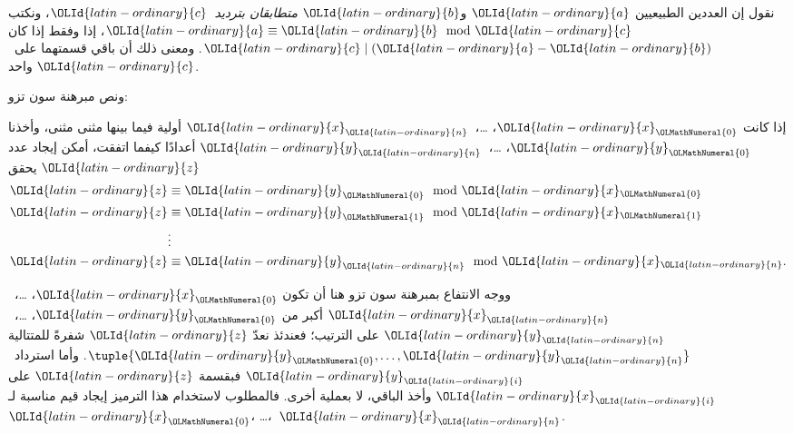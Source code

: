 \documentclass[../../../include/open-logic-section]{subfiles}
\begin{document}
\begin{defn}
نقول إن العددين الطبيعيين $\OLId{latin-ordinary}{a}$ و$\OLId{latin-ordinary}{b}$ \emph{متطابقان بترديد~$\OLId{latin-ordinary}{c}$}، ونكتب
$\OLId{latin-ordinary}{a}\equiv \OLId{latin-ordinary}{b}\mod \OLId{latin-ordinary}{c}$، إذا وفقط إذا كان $\OLId{latin-ordinary}{c}\mid(\OLId{latin-ordinary}{a}-\OLId{latin-ordinary}{b})$.
ومعنى ذلك أن باقي قسمتهما على~$\OLId{latin-ordinary}{c}$ واحد.
\end{defn}

ونص مبرهنة سون تزو:
\begin{thm}
إذا كانت $\OLId{latin-ordinary}{x}_\OLMathNumeral{0}$، \dots،~$\OLId{latin-ordinary}{x}_\OLId{latin-ordinary}{n}$ أولية فيما بينها مثنى مثنى، وأخذنا
$\OLId{latin-ordinary}{y}_\OLMathNumeral{0}$، \dots،~$\OLId{latin-ordinary}{y}_\OLId{latin-ordinary}{n}$ أعدادًا كيفما اتفقت، أمكن إيجاد عدد $\OLId{latin-ordinary}{z}$ يحقق
\begin{align*}
\OLId{latin-ordinary}{z} & \equiv \OLId{latin-ordinary}{y}_\OLMathNumeral{0} \mod \OLId{latin-ordinary}{x}_\OLMathNumeral{0} \\
\OLId{latin-ordinary}{z} & \equiv \OLId{latin-ordinary}{y}_\OLMathNumeral{1} \mod \OLId{latin-ordinary}{x}_\OLMathNumeral{1} \\
& \vdots  \\
\OLId{latin-ordinary}{z} & \equiv \OLId{latin-ordinary}{y}_\OLId{latin-ordinary}{n} \mod \OLId{latin-ordinary}{x}_\OLId{latin-ordinary}{n}.
\end{align*}
\end{thm}

ووجه الانتفاع بمبرهنة سون تزو هنا أن تكون $\OLId{latin-ordinary}{x}_\OLMathNumeral{0}$، \dots،~$\OLId{latin-ordinary}{x}_\OLId{latin-ordinary}{n}$
أكبر من $\OLId{latin-ordinary}{y}_\OLMathNumeral{0}$، \dots،~$\OLId{latin-ordinary}{y}_\OLId{latin-ordinary}{n}$ على الترتيب؛ فعندئذ نعدّ $\OLId{latin-ordinary}{z}$
شفرةً للمتتالية $\tuple{\OLId{latin-ordinary}{y}_\OLMathNumeral{0},\dots,\OLId{latin-ordinary}{y}_\OLId{latin-ordinary}{n}}$. وأما استرداد~$\OLId{latin-ordinary}{y}_\OLId{latin-ordinary}{i}$
فبقسمة $\OLId{latin-ordinary}{z}$ على $\OLId{latin-ordinary}{x}_\OLId{latin-ordinary}{i}$ وأخذ الباقي، لا بعملية أخرى.
فالمطلوب لاستخدام هذا الترميز إيجاد قيم مناسبة لـ$\OLId{latin-ordinary}{x}_\OLMathNumeral{0}$، \dots،~$\OLId{latin-ordinary}{x}_\OLId{latin-ordinary}{n}$.
\end{document}
